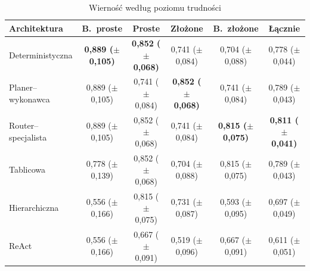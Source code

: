   \begin{table}[H]
    \caption{Wierność według poziomu trudności}\label{tab:wiernosc-trudnosc}
    \centering
    \footnotesize
    \renewcommand{\arraystretch}{1.3}
    \begin{tabular}{@{} l c c c c c @{}}
      \toprule
      \textbf{Architektura}
      & \textbf{B.~proste}
      & \textbf{Proste}
      & \textbf{Złożone}
      & \textbf{B.~złożone}
      & \textbf{Łącznie}                                                                                                                                                                  \\
      \midrule
      Deterministyczna    & \textbf{0{,}889 (\(\pm\) 0{,}105)} & \textbf{0{,}852 (\(\pm\) 0{,}068)} & 0{,}741 (\(\pm\) 0{,}084)          & 0{,}704 (\(\pm\) 0{,}088)          & 0{,}778 (\(\pm\) 0{,}044)          \\
      Planer--wykonawca   & 0{,}889 (\(\pm\) 0{,}105)          & 0{,}741 (\(\pm\) 0{,}084)          & \textbf{0{,}852 (\(\pm\) 0{,}068)} & 0{,}741 (\(\pm\) 0{,}084)          & 0{,}789 (\(\pm\) 0{,}043)          \\
      Router--specjalista & 0{,}889 (\(\pm\) 0{,}105)          & 0{,}852 (\(\pm\) 0{,}068)          & 0{,}741 (\(\pm\) 0{,}084)          & \textbf{0{,}815 (\(\pm\) 0{,}075)} & \textbf{0{,}811 (\(\pm\) 0{,}041)} \\
      Tablicowa           & 0{,}778 (\(\pm\) 0{,}139)          & 0{,}852 (\(\pm\) 0{,}068)          & 0{,}704 (\(\pm\) 0{,}088)          & 0{,}815 (\(\pm\) 0{,}075)          & 0{,}789 (\(\pm\) 0{,}043)          \\
      Hierarchiczna       & 0{,}556 (\(\pm\) 0{,}166)          & 0{,}815 (\(\pm\) 0{,}075)          & 0{,}731 (\(\pm\) 0{,}087)          & 0{,}593 (\(\pm\) 0{,}095)          & 0{,}697 (\(\pm\) 0{,}049)          \\
      ReAct               & 0{,}556 (\(\pm\) 0{,}166)          & 0{,}667 (\(\pm\) 0{,}091)          & 0{,}519 (\(\pm\) 0{,}096)          & 0{,}667 (\(\pm\) 0{,}091)          & 0{,}611 (\(\pm\) 0{,}051)          \\
      \bottomrule
    \end{tabular}
  \end{table}

